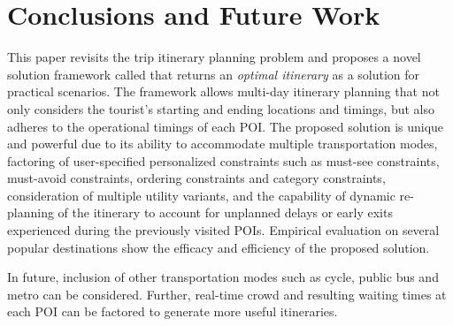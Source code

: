 \section{Conclusions and Future Work}
\label{Conclusions}

This paper revisits the trip itinerary planning problem and proposes a novel
solution framework called \trip that returns an \emph{optimal itinerary} as a
solution for practical scenarios. The \trip framework allows multi-day itinerary
planning that not only considers the tourist's starting and ending locations and
timings, but also adheres to the operational timings of each POI. The proposed
solution is unique and powerful due to its ability to accommodate multiple
transportation modes, factoring of user-specified personalized constraints such
as must-see constraints, must-avoid constraints, ordering constraints and
category constraints, consideration of multiple utility variants, and the
capability of dynamic re-planning of the itinerary to account for unplanned
delays or early exits experienced during the previously visited POIs. Empirical
evaluation on several popular destinations show the efficacy and efficiency of
the proposed solution.

In future, inclusion of other transportation modes such as cycle, public bus and
metro can be considered. Further, real-time crowd and resulting waiting times at
each POI can be factored to generate more useful itineraries.

